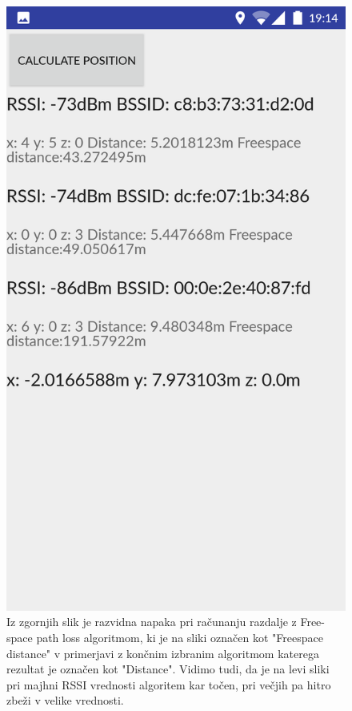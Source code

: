 \documentclass[11pt,a4paper,slovene]{article}
\begin{document}
\begin{figure}[htb]
\includegraphics[scale=0.15]{slike/freespace2.png}
\caption{Iz zgornjih slik je razvidna napaka pri računanju razdalje z Free-space path loss algoritmom, ki je na sliki označen kot "Freespace distance" v primerjavi z končnim izbranim algoritmom katerega rezultat je označen kot "Distance". Vidimo tudi, da je na levi sliki pri majhni RSSI vrednosti algoritem kar točen, pri večjih pa hitro zbeži v velike vrednosti.}
\end{figure}
\end{document}
